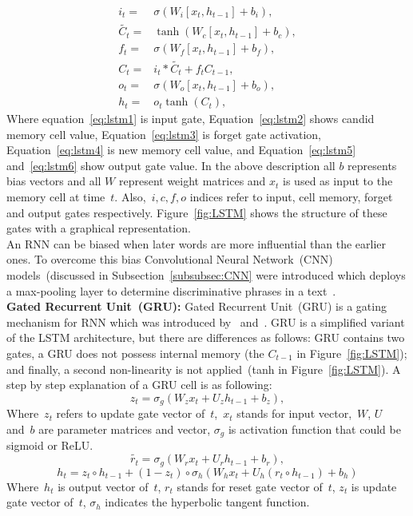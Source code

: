 \documentclass[sigconf, final]{acmart}
\begin{document}
\begin{align}
    &&i_{t}=&\sigma(W_{i}[x_{t},h_{t-1}]+b_{i}),&& \label{eq:lstm1}\\
    &&\tilde{C_{t}}=&\tanh(W_{c}[x_{t},h_{t-1}]+b_{c}),&& \label{eq:lstm2} \\
    &&f_{t}=&\sigma(W_{f}[x_{t},h_{t-1}]+b_{f}),&& \label{eq:lstm3}\\
    &&C_{t}=&  i_{t}* \tilde{C_{t}}+f_{t} C_{t-1},&& \label{eq:lstm4}\\
    &&o_{t}=& \sigma(W_{o}[x_{t},h_{t-1}]+b_{o}),&& \label{eq:lstm5}\\
    &&h_{t}=&o_{t}\tanh(C_{t}),&&\label{eq:lstm6}
\end{align}
Where equation~\ref{eq:lstm1} is input gate, Equation~\ref{eq:lstm2} shows candid memory cell value, Equation~\ref{eq:lstm3} is forget gate activation, Equation~\ref{eq:lstm4} is new memory cell value, and  Equation~\ref{eq:lstm5} and~\ref{eq:lstm6} show output gate value. In the above description all $b$ represents bias vectors and all $W$ represent weight matrices and $x_{t}$ is used as input to the memory cell at time~$t$. Also,~$i,c,f,o$ indices refer to input, cell memory, forget and output gates respectively.
 Figure~\ref{fig:LSTM} shows the structure of these gates with a graphical representation.\\
An RNN can be biased when later words are more influential than the earlier ones. To overcome this bias Convolutional Neural Network~(CNN)  models~(discussed in Subsection~\ref{subsubsec:CNN} were introduced which deploys a max-pooling layer to determine discriminative phrases in a text~\cite{lai2015recurrent}.\\

\textbf{Gated Recurrent Unit~(GRU):}\label{subsec:GRU}
Gated Recurrent Unit~(GRU) is a gating mechanism for RNN which was introduced by~\cite{chung2014empirical} and~\cite{cho2014learning}. GRU is a simplified variant of the
LSTM architecture, but there are differences as follows: GRU contains two gates, a GRU does not possess internal memory (the $C_{t-1}$ in Figure~\ref{fig:LSTM}); and finally, a second non-linearity is not applied~(tanh in Figure~\ref{fig:LSTM}). A step by step explanation of a GRU cell is as following:
\begin{equation}
z_{t}=\sigma_g(W_{z}x_{t}+U_zh_{t-1}+b_{z}), \label{eq:gru1}
\end{equation}
Where~$z_t$ refers to update gate vector of~$t$,~$x_t$ stands for input vector,~$W$, $U$ and~$b$ are parameter matrices and vector, $\sigma_g$ is activation function that could be sigmoid or ReLU.
\begin{equation}
    \tilde{r_{t}}=\sigma_g(W_{r}x_{t}+U_rh_{t-1}+b_{r}), \label{eq:gru2}
\end{equation}\begin{equation}
   h_t =  z_t \circ h_{t-1} + (1-z_t) \circ \sigma_h(W_{h} x_t + U_{h} (r_t \circ h_{t-1}) + b_h)\label{eq:gru6}
\end{equation}
Where~$h_t$ is output vector of~$t$, $r_t$ stands for reset gate vector of~$t$, $z_t$ is update gate vector of~$t$, $\sigma_h$ indicates the hyperbolic tangent function.
\end{document}
